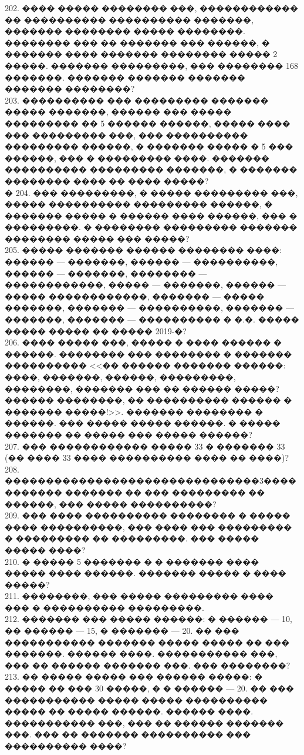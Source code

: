 \documentclass[12pt]{article}
\begin{document}
202. ���� ����� �������� ���, ������������ �� ���������� ���������� �������, ������� �������� ����� ��������. �������� ��� �� ������� ��� ������, � ������� ���� ������� �������� ����� 2 �����. ������� ���������, ��� �������� 168 �������. ������� ������� ������� ������� ��������?\\
203. ���������� ��� ��������� ������� ����� �������, ������ ��� ����� ��������� �� 5 ������ ������, ����� ���� ��� ��������� ���, ��� ���������� ��������� ������, � ������� ����� � 5 ��� ������, ��� � ��������� ����. ������� ���������� ��������� �������, � ������� �������� ���� �� ���� �����?\\�
204. ��� ���������, � ����� ��������� ���, ����� ���������� ��������� ������, � ������� ����� � ������ ���� ������, ��� � ���������. � �������� ��������� ������� �������� ����� ��� �����?\\
205. ����� ������� ������ �������� ����: ������ --- �������, ������ --- ����������, ������ --- �������, �������� --- ������������, ����� --- �������, ������ --- ����� ������������, ������� --- ����� �������, ������� --- ����������, ������� --- �������, ������� --- ���������� � �.�. ����� ����� ����� �� ����� 2019-�?\\
206. ���� ����� ���, ����� � ���� ������ � ������. �������� ��� �������� � ������� ���������� <<�� ������ ������� ������: ����, �������, ������, ���������, ��������, ������� ��� �� ������ �����? ������ ��������, �� ���������� ������ � ������� �����!>>. ������� �������� � ������. ��� ����� ����� ������.  � ����� ������� �� ����� ��� ����� ������?\\
207. ��� ������������ ����� 33 � ������� 33 (�� ���� 33 ���� ���������� ���� �� ����)?\\
208. �������������������������������3����������� ������� �� ��� ��������� �� ������, ��� ����� ����������?\\
209. ��� ���� ���������� �������� � ����� ���� ����������, ��� ���� ��� ��������� � ��������� �� ���������. ��� ����� ����� ����?\\
210. � ����� 5 ������� � � ������� ���� ����� ���� ������. ������� ����� � ���� �����?\\
211. ��������, ��� ����� ��������� ���� ��� � ���������� ���������.\\
212. ������� ��� ����� ������: � ������ --- 10, �� ������ --- 15, � ������� --- 20. �� ��� ����������� ������� ����� ����� �� ��� �������. ������ ����. ����������� ���, ��� �� ������ ������� ���. ��� ��������?\\
213. �� ����� ����� ��� ������ �����: � ����� �� ��� 30 �����, � � ������ --- 20. �� ��� ����������� ����� ����� ���������� ����� �� ����� ������. ������ ����. ����������� ���, ��� �� ������ ������� ���. ��� �� ������� ���������� ��� ���������� ����?\\
\end{document}
